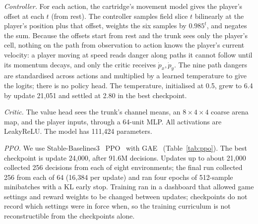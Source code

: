 \documentclass[journal]{IEEEtran}
\begin{document}
\emph{Controller.} For each action, the cartridge's movement model gives the
player's offset at each $t$ (from rest). The controller samples field slice
$t$ bilinearly at the player's position plus that offset, weights the six
samples by $0.985^t$, and negates the sum. Because the offsets start from rest
and the trunk sees only the player's cell, nothing on the path from
observation to action knows the player's current velocity: a player moving at
speed reads danger along paths it cannot follow until its momentum decays,
and only the critic receives $\dot p_x, \dot p_y$. The nine path dangers are standardised across
actions and multiplied by a learned temperature to give the logits; there is
no policy head. The temperature, initialised at 0.5, grew to 6.4 by update
21,051 and settled at 2.80 in the best checkpoint.

\emph{Critic.} The value head sees the trunk's channel means, an
$8\times4\times4$ coarse arena map, and the player inputs, through a 64-unit
MLP. All activations are LeakyReLU. The model has 111,424 parameters.

\emph{PPO.} We use Stable-Baselines3~\cite{sb3} PPO~\cite{ppo} with
GAE~\cite{gae} (Table~\ref{tab:ppo}). The best checkpoint is update 24,000,
after 91.6M decisions. Updates up to about 21,000 collected 256 decisions
from each of eight environments; the final run collected 256 from each of
64 (16,384 per update) and ran four epochs of 512-sample minibatches with a
KL early stop. Training ran in a dashboard that allowed game settings
and reward weights to be changed between updates; checkpoints do not record
which settings were in force when, so the training curriculum is not
reconstructible from the checkpoints alone.
\end{document}
